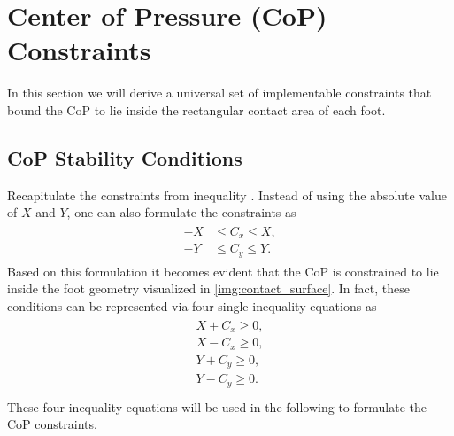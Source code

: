 \section{Center of Pressure (CoP) Constraints}\label{sec:StabilityCoP}
In this section we will derive a universal set of implementable constraints that bound the \gls{CoP} to lie inside the rectangular contact area of each foot.

\subsection{CoP Stability Conditions}
Recapitulate the constraints from inequality . Instead of using the absolute value of $X$ and $Y$, one can also formulate the constraints as
\begin{align}
\begin{split}
-X &\leq C_x \leq X,\\
-Y &\leq C_y \leq Y.
\end{split}
\end{align}
Based on this formulation it becomes evident that the \gls{CoP} is constrained to lie inside the foot geometry visualized in \cref{img:contact_surface}. In fact, these conditions can be represented via four single inequality equations as
\begin{align}\label{eqn:CoPInequalities}
\begin{split}
X + C_x \geq 0, \\
X - C_x \geq 0, \\
Y + C_y \geq 0, \\
Y - C_y \geq 0. \\
\end{split}
\end{align}
These four inequality equations will be used in the following to formulate the \gls{CoP} constraints.   

